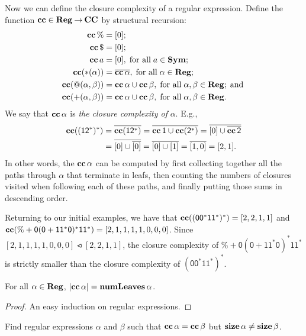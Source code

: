 Now we can define the closure complexity of a regular expression.
Define the function $\mathbf{cc}\in\mathbf{Reg}\mathbin{\to}\mathbf{CC}$ by structural recursion:
\begin{align*}
\mathbf{cc}\,\% &= [0]; \\
\mathbf{cc}\,\$ &= [0]; \\
\mathbf{cc}\,a &= [0], \;\allowbreak\mbox{for all}\allowbreak\;a\in\mathbf{Sym}; \\
\mathbf{cc}({*}(\alpha)) &= \overline{\mathbf{cc}\,\alpha}, \;\allowbreak\mbox{for all}\allowbreak\;\alpha\in\mathbf{Reg};\\
\mathbf{cc}(@(\alpha,\beta)) &= \mathbf{cc}\,\alpha\cup\mathbf{cc}\,\beta ,
\;\allowbreak\mbox{for all}\allowbreak\;\alpha,\beta\in\mathbf{Reg}; \;\allowbreak\mbox{and}\allowbreak\; \\
\mathbf{cc}({+}(\alpha,\beta)) &= \mathbf{cc}\,\alpha\cup\mathbf{cc}\,\beta,
\;\allowbreak\mbox{for all}\allowbreak\;\alpha,\beta\in\mathbf{Reg} .
\end{align*}
We say that $\mathbf{cc}\,\alpha$ is \emph{the closure complexity of} $\alpha$.
E.g.,
\begin{align*}
  \mathbf{cc}(\mathsf{(12^*)^*})
  &= \overline{\mathbf{cc}(\mathsf{12^*})} =
  \overline{\mathbf{cc}\,\mathsf{1} \cup \mathbf{cc}(\mathsf{2^*})} =
  \overline{[0] \cup \overline{\mathbf{cc}\,\mathsf{2}}} \\
  &= \overline{[0] \cup \overline{[0]}} =
  \overline{[0] \cup [1]} =
  \overline{[1, 0]} =
  [2, 1] .
\end{align*}
In other words, the $\mathbf{cc}\,\alpha$ can be computed by first collecting
together all the paths through $\alpha$ that terminate in leafs, then
counting the numbers of closures visited when following each of these
paths, and finally putting those sums in descending order.

Returning to our initial examples, we have that
$\mathbf{cc}(\mathsf{(00^*11^*)^*}) = [2,2,1,1]$ and $\mathbf{cc}(\% + \mathsf{0(0 +
  11^*0)^*11^*}) = [2,1,1,1,1,0,0,0]$.  Since
$[2,1,1,1,1,0,0,0]\ltcc[2,2,1,1]$, the closure
complexity of $\% + \mathsf{0(0 + 11^*0)^*11^*}$ is strictly smaller
than the closure complexity of $\mathsf{(00^*11^*)^*}$.

\begin{proposition}
For all $\alpha\in\mathbf{Reg}$, $|\mathbf{cc}\,\alpha| = \mathbf{numLeaves}\,\alpha$.
\end{proposition}

\begin{proof}
An easy induction on regular expressions.
\end{proof}

\begin{exercise}
Find regular expressions $\alpha$ and $\beta$ such that
$\mathbf{cc}\,\alpha = \mathbf{cc}\,\beta$ but $\mathbf{size}\,\alpha\neq\mathbf{size}\,\beta$.
\end{exercise}

